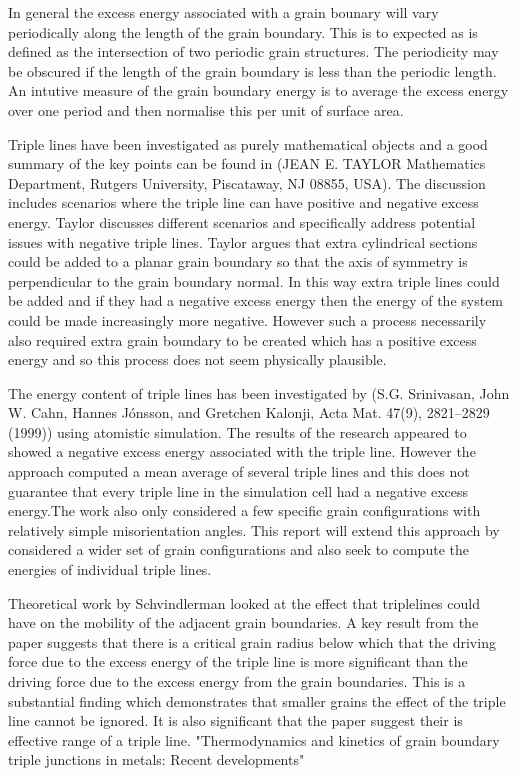 \documentclass[12pt,a4paper]{book}
\begin{document}
In general the excess energy associated with a grain bounary will vary periodically along the length of the grain boundary. This is to expected as is defined as the intersection of two periodic grain structures. The periodicity may be obscured if the length of the grain boundary is less than the periodic length. An intutive measure of the grain boundary energy is to average the excess energy over one period and then normalise this per unit of surface area.

Triple lines have been investigated as purely mathematical objects and a good summary of the key points can be found in (JEAN E. TAYLOR Mathematics Department, Rutgers University, Piscataway, NJ 08855, USA). The discussion includes scenarios where the triple line can have positive and negative excess energy. Taylor discusses different scenarios and specifically address potential issues with negative triple lines. Taylor argues that extra cylindrical sections could be added to a planar grain boundary so that the axis of symmetry is perpendicular to the grain boundary normal. In this way extra triple lines could be added and if they had a negative excess energy then the energy of the system could be made increasingly more negative. However such a process necessarily also required extra grain boundary to be created which has a positive excess energy and so this process does not seem physically plausible.



The energy content of triple lines has been investigated by (S.G. Srinivasan, John W. Cahn, Hannes Jónsson, and Gretchen Kalonji, Acta Mat. 47(9), 2821–2829 (1999)) using atomistic simulation. The results of the research appeared to showed a negative excess energy associated with the triple line. However the approach computed a mean average of several triple lines and this does not guarantee that every triple line in the simulation cell had a negative excess energy.The work also only considered a few specific grain configurations with relatively simple misorientation angles. This report will extend this approach by considered a wider set of grain configurations and also seek to compute the energies of individual triple lines.

Theoretical work by Schvindlerman looked at the effect that triplelines could have on the mobility of the adjacent grain boundaries. A key result from the paper suggests that there is a critical grain radius below which that the driving force due to the excess energy of the triple line is more significant than the driving force due to the excess energy from the grain boundaries. This is a substantial finding which demonstrates that smaller grains the effect of the triple line cannot be ignored. It is also significant that the paper suggest their is effective range of a triple line.  "Thermodynamics and kinetics of grain boundary triple junctions in metals: Recent developments"
\end{document}
